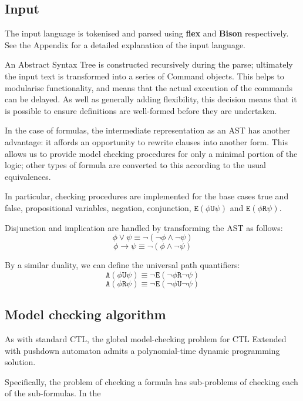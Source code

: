 \documentclass[11pt]{article}
\theoremstyle{definition}
\begin{document}


\subsection{Input}
The input language is tokenised and parsed using \textbf{flex} and
\textbf{Bison} respectively. See the Appendix for a detailed explanation of the
input language.

An Abstract Syntax Tree is constructed recursively during the parse; ultimately
the input text is transformed into a series of Command objects. This helps to
modularise functionality, and means that the actual execution of the commands
can be delayed. As well as generally adding flexibility, this decision means
that it is possible to ensure definitions are well-formed before they are
undertaken.

In the case of formulas, the intermediate representation as an AST has another
advantage: it affords an opportunity to rewrite clauses into another form.
This allows us to provide model checking procedures for only a minimal portion
of the logic; other types of formula are converted to this according to the
usual equivalences.

In particular, checking procedures are implemented for the base cases true and
false, propositional variables, negation, conjunction,
$\texttt{E}(\phi\texttt{U}\psi)$ and $\texttt{E}(\phi\texttt{R}\psi)$.

Disjunction and implication are handled by transforming the AST as follows:
\[ \phi \vee \psi \equiv \neg ( \neg \phi \wedge \neg \psi ) \]
\[ \phi \rightarrow \psi \equiv \neg ( \phi \wedge \neg \psi ) \]

By a similar duality, we can define the universal path quantifiers:\cite{Kreutzer10}
\[ \texttt{A}(\phi\texttt{U}\psi) \equiv \neg\texttt{E}(\neg\phi\texttt{R}\neg\psi) \]
\[ \texttt{A}(\phi\texttt{R}\psi) \equiv \neg\texttt{E}(\neg\phi\texttt{U}\neg\psi) \]


\subsection{Model checking algorithm}

As with standard CTL, the global model-checking problem for CTL Extended with
pushdown automaton admits a polynomial-time dynamic programming solution.

Specifically, the problem of checking a formula has sub-problems of checking
each of the sub-formulas. In the %
\end{document}

